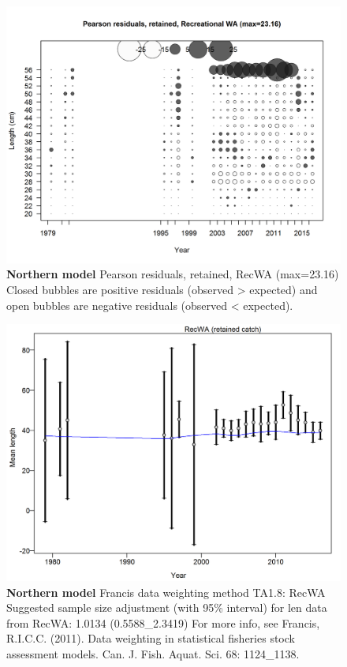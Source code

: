 \documentclass[12pt,]{article}
\begin{document}
\begin{figure}[htbp]
\centering
\includegraphics{./r4ss/plots_mod1/comp_lenfit_residsflt4mkt2.png}
\caption{\textbf{Northern model} Pearson residuals, retained, RecWA
(max=23.16)\\
Closed bubbles are positive residuals (observed \textgreater{} expected)
and open bubbles are negative residuals (observed \textless{} expected).
\label{fig:mod1_19_comp_lenfit_residsflt4mkt2}}
\end{figure}

\begin{figure}[htbp]
\centering
\includegraphics{./r4ss/plots_mod1/comp_lenfit_data_weighting_TA1.8_RecWA.png}
\caption{\textbf{Northern model} Francis data weighting method TA1.8:
RecWA Suggested sample size adjustment (with 95\% interval) for len data
from RecWA: 1.0134 (0.5588\_2.3419) For more info, see Francis, R.I.C.C.
(2011). Data weighting in statistical fisheries stock assessment models.
Can. J. Fish. Aquat. Sci. 68: 1124\_1138.
\label{fig:mod1_21_comp_lenfit_data_weighting_TA1.8_RecWA}}
\end{figure}
\end{document}
